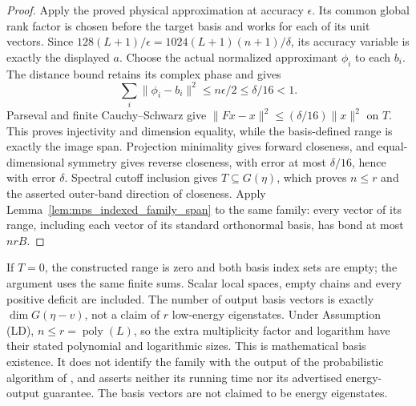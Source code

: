 \begin{proof}\leanok
    Apply the proved physical approximation at accuracy $\epsilon$.
    Its common global rank factor is chosen before the target basis
    and works for each of its unit vectors. Since
    $128(L+1)/\epsilon=1024(L+1)(n+1)/\delta$, its accuracy variable
    is exactly the displayed $a$.
    Choose the actual normalized approximant $\phi_i$ to each $b_i$.
    The distance bound retains its complex phase and gives
    \[
      \sum_i\|\phi_i-b_i\|^2
         \le n\epsilon/2\le\delta/16<1.
    \]
    Parseval and finite Cauchy--Schwarz give
    $\|Fx-x\|^2\le(\delta/16)\|x\|^2$ on $T$.
    This proves injectivity and dimension equality, while the basis-defined
    range is exactly the image span. Projection minimality gives forward
    closeness, and equal-dimensional symmetry gives reverse closeness,
    with error at most $\delta/16$, hence with error $\delta$.
    Spectral cutoff inclusion gives $T\subseteq G(\eta)$, which
    proves $n\le r$ and the asserted outer-band direction of closeness.
    Apply Lemma~\ref{lem:mps_indexed_family_span} to the same family:
    every vector of its range, including each vector of its standard
    orthonormal basis, has bond at most $nrB$.
\end{proof}

If $T=0$, the constructed range is zero and both basis index sets are empty;
the argument uses the same finite sums. Scalar local spaces, empty chains
and every positive deficit are included. The number of output basis vectors
is exactly $\dim G(\eta-v)$, not a claim of $r$ low-energy eigenstates.
Under Assumption (LD), $n\le r=\operatorname{poly}(L)$, so the extra
multiplicity factor and logarithm have their stated polynomial and
logarithmic sizes. This is mathematical basis existence. It does not
identify the family with the output of the probabilistic algorithm of
\cite[Theorem~t:alg2, lines 1869--1874]{Arad2016RigorousRG}, and asserts
neither its running time nor its advertised energy-output guarantee.
The basis vectors are not claimed to be energy eigenstates.
